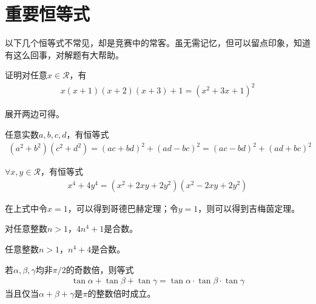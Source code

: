 \section{重要恒等式}
\label{sec:important-identities}

以下几个恒等式不常见，却是竞赛中的常客。虽无需记忆，但可以留点印象，知道有这么回事，对解题有大帮助。

\begin{example}证明对任意$x\in\mathcal{R}$，有
  \begin{align*}
    x(x+1)(x+2)(x+3)+1=\left( x^2+3x+1\right )^2
  \end{align*}
\end{example}
展开两边可得。

\begin{theorem}任意实数$a,b,c,d$，有恒等式
  \begin{align*}
    \left(a^2+b^2\right)\left(c^2+d^2\right)
    = \left(ac +  bd\right)^2 + \left(ad -  bc\right)^2
    = \left(ac -  bd\right)^2 + \left(ad +  bc\right)^2 
  \end{align*}
\end{theorem}

\begin{example}$\forall x,y\in\mathcal{R}$，有恒等式
  \begin{align*}
    x^4+4y^4 = \left(x^2+2xy+2y^2\right)\left(x^2-2xy+2y^2\right)
  \end{align*}
\end{example}
在上式中令$x=1$，可以得到哥德巴赫定理；令$y=1$，则可以得到吉梅茵定理。
\begin{theorem}\mbox{}\par
  对任意整数$n>1$，$4n^4+1$是合数。  
\end{theorem}
\begin{theorem}\mbox{}\par
  任意整数$n>1$，$n^4+4$是合数。
\end{theorem}

\begin{theorem}
  若$\alpha, \beta, \gamma$均非$\pi/2$的奇数倍，则等式
  \begin{align*}
    \tan\alpha +\tan\beta+\tan\gamma=\tan\alpha \cdot \tan\beta \cdot \tan\gamma
  \end{align*}
  当且仅当$\alpha+\beta+\gamma$是$\pi$的整数倍时成立。
\end{theorem}